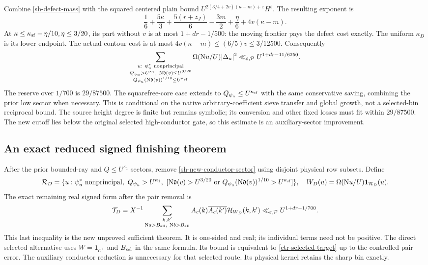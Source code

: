 \documentclass[11pt]{article}
\theoremstyle{definition}
\newcommand{\N}{\mathrm N}
\newcommand{\eps}{\varepsilon}
\newcommand{\Id}{\mathbf 1}
\newcommand{\Cplus}{\mathcal C^+}
\newcommand{\lls}{\ll_{\eps,\mathcal P}}
\begin{document}
Combine \eqref{sh-defect-mass} with the squared centered plain
bound $U^{2(3/4+2v)(\kappa-m)+\eps}H^b$.
The resulting exponent is
\[
 \frac16+\frac{5\kappa}{3}+\frac{5(r+z_J)}6-\frac{3m}{2}
                  +\frac{\eta}{6}+4v(\kappa-m).
\]
At $\kappa\le\kappa_{\rm sf}-\eta/10,\eta\le3/20$, its part
without $v$ is at most $1+dr-1/500$: the moving frontier
pays the defect cost exactly. The uniform $\kappa_D$ is its
lower endpoint.
The actual contour cost is at most
$4v(\kappa-m)\le(6/5)v\le3/12500$. Consequently
\begin{equation}\label{sh-new-conductor-sector}
 \sum_{\substack{u:\ \psi_u^*\ {\rm nonprincipal}\\
 Q_{\psi_u}>U^{\kappa_1},\ \N\mathfrak d(v)\le U^{3/20}\\
 Q_{\psi_u}(\N\mathfrak d(v))^{1/10}\le U^{\kappa_{\rm sf}}}}
 \Omega(\N u/U)|\Delta_u|^2
 \lls U^{1+dr-11/6250}.
\end{equation}
The reserve over $1/700$ is $29/87500$. The squarefree-core case
extends to $Q_{\psi_u}\le U^{\kappa_{\rm sf}}$ with the same
conservative saving, combining the prior low sector when necessary.
This is conditional on the native arbitrary-coefficient sieve
transfer and global growth, not a selected-bin reciprocal bound.
The source height degree is finite but remains symbolic; its
conversion and other fixed losses must fit within $29/87500$.
The new cutoff lies below the original selected high-conductor gate,
so this estimate is an auxiliary-sector improvement.

\subsection{An exact reduced signed finishing theorem}
After the prior bounded-ray and $Q\le U^{\kappa_1}$ sectors, remove
\eqref{sh-new-conductor-sector} using disjoint physical row subsets.
Define
\[
 \mathcal R_D=\{u:\psi_u^*\ {\rm nonprincipal},\
 Q_{\psi_u}>U^{\kappa_1},\
 [\N\mathfrak d(v)>U^{3/20}\ {\rm or}\
 Q_{\psi_u}(\N\mathfrak d(v))^{1/10}>U^{\kappa_{\rm sf}}]\},
 \quad W_D(u)=\Omega(\N u/U)\Id_{\mathcal R_D}(u).
\]
The exact remaining real signed form after the pair removal is
\begin{equation}\label{sh-reduced-signed-target}
 \mathcal T_D=
 X^{-1}\sum_{\substack{k,k'\\
                 \N a>B_{\rm all},\ \N b>B_{\rm all}}}
 A_c(k)\overline{A_c(k')}\mathcal H_{W_D}(k,k')
 \lls U^{1+dr-1/700}.
\end{equation}
This last inequality is the new unproved sufficient theorem.
It is one-sided and real; its individual terms need not be positive.
The direct selected alternative uses $W=\Id_{\Cplus}$ and
$B_{\rm sel}$ in the same formula. Its bound is equivalent to
\eqref{ctr-selected-target} up to the controlled pair error.
The auxiliary conductor reduction is unnecessary for that selected
route. Its physical kernel retains the sharp bin exactly.
\end{document}
